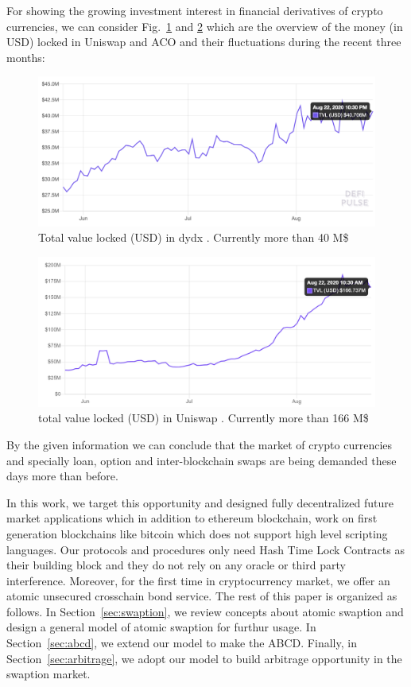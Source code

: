 For showing the growing investment interest in financial derivatives of crypto currencies, we can consider Fig.~\ref{fig:TVL-ACO} and \ref{fig:TVL-Uniswap} which are the overview of the money (in USD) locked in Uniswap and ACO and their fluctuations during the recent three months:
\begin{figure}
    \centering
    \includegraphics[width=\textwidth]{figures/dydx.png}
    \caption{Total value locked (USD) in dydx \cite{dydx-cap}. Currently more than 40 M\$}
    \label{fig:TVL-ACO}
\end{figure}
\begin{figure}
    \centering
    \includegraphics[width=\textwidth]{figures/TVL(USD)-uniswap-90.png}
    \caption{total value locked (USD) in Uniswap \cite{uniswap-cap}. Currently more than 166 M\$}
    \label{fig:TVL-Uniswap}
\end{figure}


By the given information we can conclude that the market of crypto currencies and specially loan, option and inter-blockchain swaps are being demanded these days more than before. 

In this work, we target this opportunity and designed fully decentralized future market applications which in addition to ethereum blockchain, work on first generation blockchains like bitcoin which does not support high level scripting languages. Our protocols and procedures only need Hash Time Lock Contracts as their building block and they do not rely on any oracle or third party interference. Moreover, for the first time in cryptocurrency market, we offer an atomic unsecured crosschain bond service. 
The rest of this paper is organized as follows. In Section~\ref{sec:swaption}, we review concepts about atomic swaption and design a general model of atomic swaption for furthur usage. In Section~\ref{sec:abcd}, we extend our model to make the ABCD. Finally, in Section~\ref{sec:arbitrage}, we adopt our model to build arbitrage opportunity in the swaption market.



